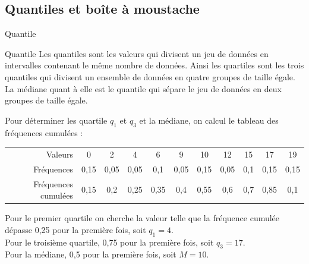 \documentclass[10pt, french]{beamer}
\begin{document}
\subsection[Répartition et quantile ]{Quantiles et boîte à moustache}
\begin{frame}{Quantile}
\begin{block}{Quantile}
Les quantiles sont les valeurs qui divisent un jeu de données en intervalles contenant le même nombre de données. Ainsi les quartiles sont les trois quantiles qui divisent un ensemble de données en quatre groupes de taille égale. La médiane quant à elle est le quantile qui sépare le jeu de données en deux groupes de taille égale.
\end{block}
Pour déterminer les quartile $q_1$ et $q_3$ et la médiane, on calcul le tableau des fréquences cumulées :
\hspace*{-2cm}\begin{tabular}{rcccccccccc}
Valeurs  & 0 &2 & 4&6&9&10&12&15&17&19\\
Fréquences &0,15  & 0,05& 0,05 &0,1&0,05&0,15&0,05&0,1&0,15&0,15\\
Fréquences cumulées&0,15  & 0,2& 0,25 &0,35&0,4&0,55&0,6&0,7&0,85&0,1
\end{tabular}
Pour le premier quartile on cherche la valeur telle que la fréquence cumulée dépasse 0,25 pour la première fois, soit $q_1=4$. \\
Pour le troisième quartile, 0,75 pour la première fois, soit $q_3=17$. \\
Pour la médiane, 0,5 pour la première fois, soit $M=10$. \\

\end{frame}
\end{document}
